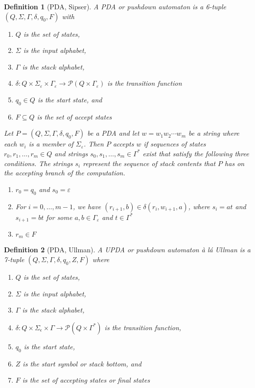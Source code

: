 \documentclass[11pt]{article}
\newtheorem{definition}{Definition}
\begin{document}
\clearpage
\begin{definition}[PDA, Sipser]
A PDA or pushdown automaton is a 6-tuple $(Q, \Sigma, \Gamma, \delta, q_0, F)$ with
\begin{enumerate}
    \item $Q$ is the set of states,
    \item $\Sigma$ is the input alphabet,
    \item $\Gamma$ is the stack alphabet,
    \item $\delta: Q \times \Sigma_\varepsilon \times \Gamma_\varepsilon \rightarrow \mathcal{P}(Q \times \Gamma_\varepsilon)$ is the transition function
    \item $q_0 \in Q$ is the start state, and
    \item $F \subseteq Q$ is the set of accept states
\end{enumerate}
Let $P = (Q, \Sigma, \Gamma, \delta, q_0, F)$ be a PDA and let $w = w_1 w_2 \cdots w_m$ be a string where each $w_i$ is a member of $\Sigma_\varepsilon$. Then $P$ accepts $w$ if 
sequences of states $r_0, r_1, \ldots, r_m \in Q$ and strings $s_0, s_1, \ldots, s_m \in \Gamma^\ast$ exist that
satisfy the following three conditions. The strings $s_i$ represent the sequence of
stack contents that $P$ has on the accepting branch of the computation.
\begin{enumerate}
    \item $r_0 = q_0$ and $s_0 = \varepsilon$
    \item For $i = 0, \ldots, m - 1$, we have $(r_{i+1}, b) \in \delta(r_i, w_{i+1}, a)$, where $s_i = at$ and $s_{i+1} = bt$ for some $a, b \in \Gamma_\varepsilon$ and $t \in \Gamma^\ast$
    \item $r_m \in F$
\end{enumerate}
\end{definition}

\bigskip

\begin{definition}[PDA, Ullman]
A UPDA or pushdown automaton \`a l\'a Ullman is a 7-tuple $(Q, \Sigma, \Gamma, \delta, q_0, Z, F)$ where
\begin{enumerate}
    \item $Q$ is the set of states,
    \item $\Sigma$ is the input alphabet,
    \item $\Gamma$ is the stack alphabet,
    \item $\delta : Q \times \Sigma_\epsilon \times \Gamma \to \mathcal{P}( Q \times \Gamma^\ast )$ is the transition function,
    \item $q_0$ is the start state,
    \item $Z$ is the start symbol or stack bottom, and
    \item $F$ is the set of accepting states or final states
\end{enumerate}
\end{definition}
\end{document}
